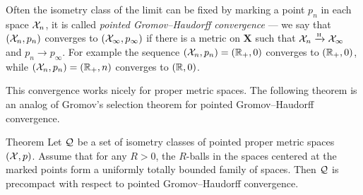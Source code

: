 Often the isometry class of the limit can be fixed by marking a point $p_n$ in each space $\mathcal{X}_n$, it is called \emph{pointed Gromov--Haudorff convergence} --- we say that $(\mathcal{X}_n,p_n)$ converges to $(\mathcal{X}_\infty,p_\infty)$ if there is a metric on $\bm{X}$ such that $\mathcal{X}_n\xrightarrow{\mbox{\tiny\rm H}} \mathcal{X}_\infty$ and $p_n\to p_\infty$.
For example the sequence $(\mathcal{X}_n,p_n)=(\mathbb{R}_+,0)$ converges to $(\mathbb{R}_+,0)$, while $(\mathcal{X}_n,p_n)=(\mathbb{R}_+,n)$ converges to $(\mathbb{R},0)$.

This convergence works nicely for proper metric spaces.
The following theorem is an analog of Gromov's selection theorem for pointed Gromov--Haudorff convergence.

\begin{thm}{Theorem}\label{thm:pointed-gromov-compactness}%
Let $\mathcal{Q}$ be a set of isometry classes of pointed proper metric spaces
$(\mathcal{X},p)$.
Assume that for any $R>0$, the $R$-balls in the spaces centered at the marked points form a uniformly totally bounded family of spaces.
Then $\mathcal{Q}$ is precompact with respect to pointed Gromov--Haudorff convergence. 
\end{thm}
